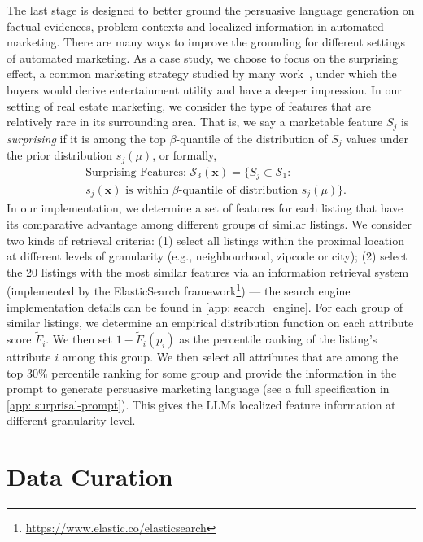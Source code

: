 The last stage is designed to better ground the persuasive language generation on factual evidences, problem contexts and localized information in automated marketing. There are many ways to improve the grounding for different settings of automated marketing. 
As a case study, we choose to focus on the surprising effect, a common marketing strategy studied by many work~\citep{lindgreen2005viral, ludden2008surprise, ely2015suspense}, under which the buyers would derive entertainment utility and have a deeper impression.
In our setting of real estate marketing, we consider the type of features that are relatively rare in its surrounding area.
That is, we say a marketable feature $S_j$ is \emph{surprising} if it is among the top $\beta$-quantile of the distribution of $S_j$ values under the prior distribution  $ s_j(\mu)$, or formally, 
 \begin{align}
     &\text{Surprising Features: } \mathcal{S}_3(\mathbf{x})   =  \{ S_j \subset \mathcal{S}_1: \nonumber \\
     &s_j(\mathbf{x}) \text{ is within $\beta$-quantile  of   distribution } s_j(\mu) \}.
 \end{align}
In our implementation, we determine a set of features for each listing that have its comparative advantage among different groups of similar listings. We consider two kinds of retrieval criteria: (1) select all listings within the proximal location at different levels of granularity (e.g., neighbourhood, zipcode or city); (2) select the 20 listings with the most similar features via an information retrieval system (implemented by the ElasticSearch framework\footnote{\url{https://www.elastic.co/elasticsearch}}) --- the search engine implementation details can be found in \cref{app: search_engine}. 
For each group of similar listings, we determine an empirical distribution function on each attribute score $\tilde{F}_i$. We then set $1 - \tilde{F}_i( p_i )$ as the percentile ranking of the listing's attribute $i$ among this group. 
We then select all attributes that are among the top $30\%$ percentile ranking for some group and provide the information in the prompt to generate persuasive marketing language (see a full specification in \cref{app: surprisal-prompt}). 
This gives the LLMs localized feature information at different granularity level. 

\section{Data Curation}
\label{app: dataset}


